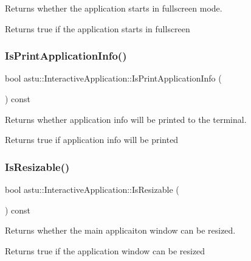 Returns whether the application starts in fullscreen mode.

\begin{DoxyReturn}{Returns}
{\ttfamily true} if the application starts in fullscreen 
\end{DoxyReturn}
\mbox{\label{classastu_1_1InteractiveApplication_aab39a60ab9b275d43c54647c0914f9b4}} 
\subsubsection{\texorpdfstring{Is\+Print\+Application\+Info()}{IsPrintApplicationInfo()}}
{\footnotesize\ttfamily bool astu\+::\+Interactive\+Application\+::\+Is\+Print\+Application\+Info (\begin{DoxyParamCaption}{ }\end{DoxyParamCaption}) const}

Returns whether application info will be printed to the terminal.

\begin{DoxyReturn}{Returns}
{\ttfamily true} if application info will be printed 
\end{DoxyReturn}
\mbox{\label{classastu_1_1InteractiveApplication_a66bceb4413315cc27216e11d6198143d}} 
\subsubsection{\texorpdfstring{Is\+Resizable()}{IsResizable()}}
{\footnotesize\ttfamily bool astu\+::\+Interactive\+Application\+::\+Is\+Resizable (\begin{DoxyParamCaption}{ }\end{DoxyParamCaption}) const}

Returns whether the main applicaiton window can be resized.

\begin{DoxyReturn}{Returns}
{\ttfamily true} if the application window can be resized 
\end{DoxyReturn}
\mbox{\label{classastu_1_1InteractiveApplication_ad2c49f542695e8532a8655de8b7927f7}} 
